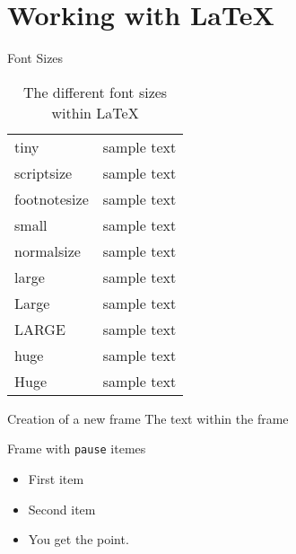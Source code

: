 
\section{Working with \LaTeX}
\begin{frame}{Font Sizes}
  \begin{table}[htdp]
\caption{The different font sizes within \LaTeX}
\begin{center}
\begin{tabular}{| l c |} \hline
 tiny                   & {\tiny sample text}\\
 scriptsize             & {\scriptsize sample text}\\
 footnotesize   & {\footnotesize sample text}\\
 small          & {\small sample text}\\
 normalsize     & {\normalsize sample text}\\
 large          & {\large sample text}\\
 Large          & {\Large sample text}\\
 LARGE          & {\LARGE sample text}\\
 huge           & {\huge sample text}\\
 Huge           & {\Huge sample text} \\\hline

\end{tabular}
\end{center}
\label{default}
\end{table}%
\end{frame}

\begin{frame}{Creation of a new frame}
The text within the frame
\end{frame}


%

\begin{frame}{Frame with \texttt{pause} itemes}
        \begin{itemize}
                \item First item \pause
                \item Second item \pause
                \item You get the point.
        \end{itemize}
\end{frame}


